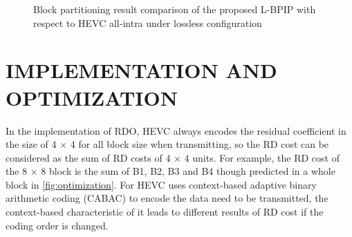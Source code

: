 \documentclass[journal]{IEEEtran}
\begin{document}
\begin{figure}[htpb]
\centering
{}

\centering

\caption{Block partitioning result comparison of the proposed L-BPIP with respect to HEVC all-intra under lossless configuration}
\label{fig:HEVC block}
\end{figure}


\section{IMPLEMENTATION AND OPTIMIZATION}


In the implementation of RDO, HEVC always encodes the residual coefficient in the size of 4 × 4 for all block size when transmitting, so the RD cost can be considered as the sum of RD costs of 4 × 4 units. For example, the RD cost of the 8 × 8 block is the sum of B1, B2, B3 and B4 though predicted in a whole block in \autoref{fig:optimization}. For HEVC uses context-based adaptive binary arithmetic coding (CABAC) to encode the data need to be transmitted, the context-based characteristic of it leads to different results of RD cost if the coding order is changed.
\end{document}
